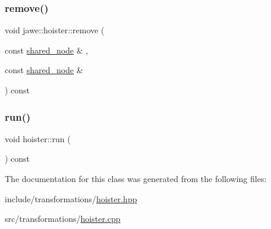 \subsubsection{\texorpdfstring{remove()}{remove()}}
{\footnotesize\ttfamily void jawe\+::hoister\+::remove (\begin{DoxyParamCaption}\item[{const \hyperlink{namespacejawe_a3f307481d921b6cbb50cc8511fc2b544}{shared\+\_\+node} \&}]{,  }\item[{const \hyperlink{namespacejawe_a3f307481d921b6cbb50cc8511fc2b544}{shared\+\_\+node} \&}]{ }\end{DoxyParamCaption}) const\hspace{0.3cm}{\ttfamily [private]}}

\mbox{\label{classjawe_1_1hoister_ad1dc4fda5106d44c88a4b63c7343fac1}} 
\subsubsection{\texorpdfstring{run()}{run()}}
{\footnotesize\ttfamily void hoister\+::run (\begin{DoxyParamCaption}{ }\end{DoxyParamCaption}) const}



The documentation for this class was generated from the following files\+:\begin{DoxyCompactItemize}
\item 
include/transformations/\hyperlink{hoister_8hpp}{hoister.\+hpp}\item 
src/transformations/\hyperlink{hoister_8cpp}{hoister.\+cpp}\end{DoxyCompactItemize}
